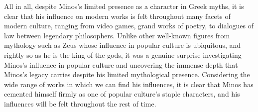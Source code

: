 \documentclass[12pt]{article}
\begin{document}
	All in all, despite Minos's limited presence as a character in Greek myths, it is clear that his influence 
	on modern works is felt throughout many facets of modern culture, ranging from video games, grand works of poetry, 
	to dialogues of law between legendary philosophers. 
	Unlike other well-known figures from mythology such as Zeus whose 
	influence in popular culture is ubiquitous, and rightly so as he is the king of the gods, it was a 
	genuine surprise investigating Minos's influence in popular culture and uncovering the immense depth that 
	Minos's legacy carries despite his limited mythological presence. Considering the wide range of works 
	in which we can find his influences, it is clear that Minos has cemented himself firmly as one of popular 
	culture's staple characters, and his influences will be felt throughout the rest of time.     


	
\end{document}
